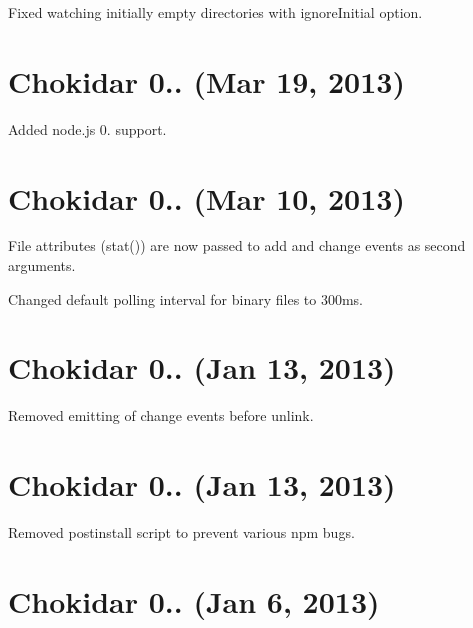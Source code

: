 \begin{DoxyItemize}
\item Fixed watching initially empty directories with {\ttfamily ignore\+Initial} option.
\end{DoxyItemize}

\section*{Chokidar 0.. (Mar 19, 2013)}


\begin{DoxyItemize}
\item Added node.\+js 0. support.
\end{DoxyItemize}

\section*{Chokidar 0.. (Mar 10, 2013)}


\begin{DoxyItemize}
\item File attributes (stat()) are now passed to {\ttfamily add} and {\ttfamily change} events as second arguments.
\item Changed default polling interval for binary files to 300ms.
\end{DoxyItemize}

\section*{Chokidar 0.. (Jan 13, 2013)}


\begin{DoxyItemize}
\item Removed emitting of {\ttfamily change} events before {\ttfamily unlink}.
\end{DoxyItemize}

\section*{Chokidar 0.. (Jan 13, 2013)}


\begin{DoxyItemize}
\item Removed postinstall script to prevent various npm bugs.
\end{DoxyItemize}

\section*{Chokidar 0.. (Jan 6, 2013)}


